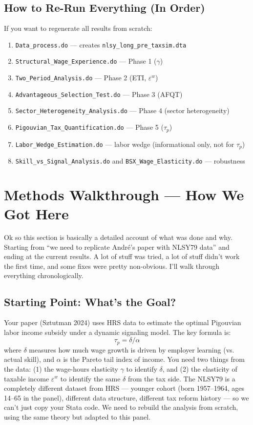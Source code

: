 \documentclass[11pt, letterpaper]{article}
\newcommand{\dofile}[1]{\texttt{#1}}
\newcommand{\datafile}[1]{\texttt{#1}}
\begin{document}
\subsection{How to Re-Run Everything (In Order)}

If you want to regenerate all results from scratch:
\begin{enumerate}
    \item \dofile{Data\_process.do} --- creates \datafile{nlsy\_long\_pre\_taxsim.dta}
    \item \dofile{Structural\_Wage\_Experience.do} --- Phase 1 ($\gamma$)
    \item \dofile{Two\_Period\_Analysis.do} --- Phase 2 (ETI, $\varepsilon^w$)
    \item \dofile{Advantageous\_Selection\_Test.do} --- Phase 3 (AFQT)
    \item \dofile{Sector\_Heterogeneity\_Analysis.do} --- Phase 4 (sector heterogeneity)
    \item \dofile{Pigouvian\_Tax\_Quantification.do} --- Phase 5 ($\tau_p$)
    \item \dofile{Labor\_Wedge\_Estimation.do} --- labor wedge (informational only, not for $\tau_p$)
    \item \dofile{Skill\_vs\_Signal\_Analysis.do} and \dofile{BSX\_Wage\_Elasticity.do} --- robustness
\end{enumerate}

\newpage
\section{Methods Walkthrough --- How We Got Here}

Ok so this section is basically a detailed account of what was done and why. Starting from ``we need to replicate André's paper with NLSY79 data'' and ending at the current results. A lot of stuff was tried, a lot of stuff didn't work the first time, and some fixes were pretty non-obvious. I'll walk through everything chronologically.

\subsection{Starting Point: What's the Goal?}

Your paper (Sztutman 2024) uses HRS data to estimate the optimal Pigouvian labor income subsidy under a dynamic signaling model. The key formula is:
$$\tau_p = \delta / \alpha$$
where $\delta$ measures how much wage growth is driven by employer learning (vs. actual skill), and $\alpha$ is the Pareto tail index of income. You need two things from the data: (1) the wage-hours elasticity $\gamma$ to identify $\delta$, and (2) the elasticity of taxable income $\varepsilon^w$ to identify the same $\delta$ from the tax side. The NLSY79 is a completely different dataset from HRS --- younger cohort (born 1957--1964, ages 14--65 in the panel), different data structure, different tax reform history --- so we can't just copy your Stata code. We need to rebuild the analysis from scratch, using the same theory but adapted to this panel.
\end{document}
